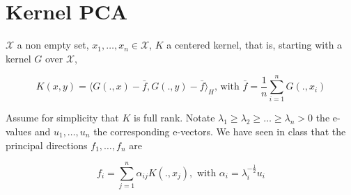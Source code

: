 \documentclass{article}
\begin{document}
\section{Kernel PCA}

$\mathcal{X}$ a non empty set, $x_1,\ldots,x_n \in \mathcal{X}$, $K$ a centered kernel, that is, starting with a kernel $G$ over $\mathcal{X}$, 

\[K(x,y)=\langle G(.,x)- \bar{f}, G(.,y)-\bar{f}\rangle_H \mbox{, with } \bar{f}=\frac{1}{n}\sum_{i=1}^n G(.,x_i)\]
    
Assume for simplicity that $K$ is full rank. Notate $\lambda_1 \geq \lambda_2 \geq \ldots \geq \lambda_n>0$ the e-values and $u_1,\ldots,u_n$ the corresponding e-vectors. 
We have seen in class that the principal directions $f_1,\ldots,f_n$ are 

\[f_i=\sum_{j=1}^n \alpha_{ij} K(.,x_j), \mbox{ with } \alpha_i = \lambda_i^{-\frac{1}{2}}u_i\]
\end{document}

